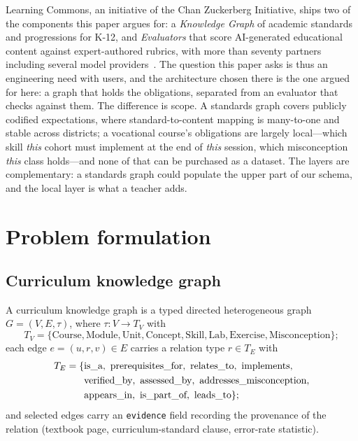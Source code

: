 \documentclass[review,12pt]{elsarticle}
\renewcommand{\_}{\kgunderscore\allowbreak}
\newcommand{\id}[1]{\texttt{#1}}
\begin{document}
Learning Commons, an initiative of the Chan Zuckerberg Initiative, ships two of
the components this paper argues for: a \emph{Knowledge Graph} of academic
standards and progressions for K-12, and \emph{Evaluators} that score
AI-generated educational content against expert-authored rubrics, with more
than seventy partners including several model providers~\cite{learningcommons2026}.
The question this paper asks is thus an engineering need with users, and the
architecture chosen there is the one argued for here: a graph that holds the
obligations, separated from an evaluator that checks against them. The
difference is scope. A standards graph covers publicly codified expectations,
where standard-to-content mapping is many-to-one and stable across districts;
a vocational course's obligations are largely local---which skill \emph{this}
cohort must implement at the end of \emph{this} session, which misconception
\emph{this} class holds---and none of that can be purchased as a dataset. The
layers are complementary: a standards graph could populate the upper part of
our schema, and the local layer is what a teacher adds.

\section{Problem formulation}

\subsection{Curriculum knowledge graph}
\label{sec:graph}

A curriculum knowledge graph is a typed directed heterogeneous graph
$G=(V,E,\tau)$, where $\tau: V \to T_V$ with
\begin{equation*}
T_V=\{\text{Course},\text{Module},\text{Unit},\text{Concept},\text{Skill},
\text{Lab},\text{Exercise},\text{Misconception}\};
\end{equation*}
each edge $e=(u,r,v)\in E$ carries a relation type $r\in T_E$ with
\begin{align*}
T_E=\{&\text{is\_a},\ \text{prerequisites\_for},\ \text{relates\_to},\
\text{implements},\\
&\text{verified\_by},\ \text{assessed\_by},\
\text{addresses\_misconception},\\
&\text{appears\_in},\ \text{is\_part\_of},\ \text{leads\_to}\};
\end{align*}
and selected edges carry an \id{evidence} field recording the provenance of the
relation (textbook page, curriculum-standard clause, error-rate statistic).
\end{document}
